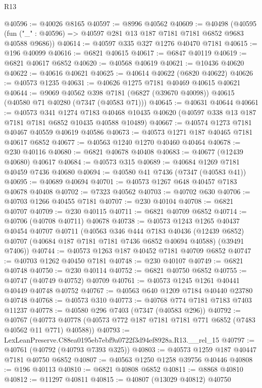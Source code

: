 \begin{lexlean}{R13}
\begin{coremodule}
@40596 := @40026 @8165
@40597 := @8996 @40562
@40609 := @40498
    (@40595 (fun ("_" : @40596) => @40597 @281 @13 @187 @7181 @7181 @6852 @9683 @40588 @9686))
@40614 := @40597 @335 @327 @1276 @40470 @7181
@40615 := @196 @40099
@40616 := @6821 @40615
@40617 := @6847 @40119
@40619 := @6821 @40617 @6852
@40620 := @40568 @40619
@40621 := @10436 @40620
@40622 := @40616 @40621
@40625 := @40614 @40622 (@6820 @40622)
@40626 := @40573 @1235
@40631 := @40626 @1275 @7181 @40469 @40615 @40621
@40644 := @9069
    @40562
    @398
    @7181
    (@6827 (@39670 @40098))
    @40615
    (@40580 @71 @40280 (@7347 (@40583 @71)))
@40645 := @40631 @40644
@40661 := @40573
    @341
    @1274
    @7183
    @40468
    @10435
    @40620
    (@40597 @338 @13 @187 @7181 @7181 @6852 @10435 @40588 @10489)
@40667 := @40574 @1273 @7181 @40467 @40559 @40619 @40586
@40673 := @40573 @1271 @187 @40465 @7181 @40617 @6852
@40677 := @40563 @1240 @1270 @40460 @40464
@40678 := @230 @40116
@40680 := @6821 @40678 @40408
@40683 := @40677 (@12439 @40680) @40617
@40684 := @40573 @315
@40689 := @40684 @1269 @7181 @40459 @7436 @40680
@40694 := @40580 @41 @7436 (@7347 (@40583 @41))
@40695 := @40689 @40694
@40701 := @40573 @1267 @648 @40457 @7183 @40678 @40408
@40702 := @7323 @40562
@40703 := @40702 @630
@40706 := @40703 @1266 @40455 @7181
@40707 := @230 @40104
@40708 := @6821 @40707
@40709 := @230 @40115
@40711 := @6821 @40709 @6852
@40714 := @40706 (@40708 @40711) @40678
@40738 := @40573
    @1243
    @1265
    @40437
    @40454
    @40707
    @40711
    (@40563
      @346
      @444
      @7183
      @40436
      (@12439 @6852)
      @40707
      (@40684 @187 @7181 @7181 @7436 @6852 @40694 @40588)
      (@39491 @7406))
@40744 := @40573 @1263 @187 @40452 @7181 @40709 @6852
@40747 := @40703 @1262 @40450 @7181
@40748 := @230 @40107
@40749 := @6821 @40748
@40750 := @230 @40114
@40752 := @6821 @40750 @6852
@40755 := @40747 (@40749 @40752) @40709
@40761 := @40573 @1245 @1261 @40441 @40449 @40748 @40752
@40767 := @40563 @640 @1209 @7184 @40440 @23780 @40748
@40768 := @40573 @310
@40773 := @40768 @774 @7181 @7183 @7403 @11237
@40778 := @40580 @296 @7403 (@7347 (@40583 @296))
@40792 := @40767
    (@40773 @40778 (@40573 @772 @187 @7181 @7181 @771 @6852 (@7483 @40562 @11 @771) @40588))
@40793 := LexLeanPreserve.C88ea0195eb7ebf9a0722f3d94ef8928a.R13.__rel_15
@40797 := @40761 (@40792 (@40793 @7393 @325))
@40803 := @40573 @1259 @187 @40447 @7181 @40750 @6852
@40807 := @40563 @1250 @1258 @39756 @40446
@40808 := @196 @40113
@40810 := @6821 @40808 @6852
@40811 := @8868 @40810
@40812 := @11297 @40811
@40815 := @40807 (@13029 @40812) @40750

\end{coremodule}
\end{lexlean}
